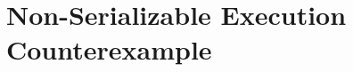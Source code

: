 
\section{Non-Serializable Execution Counterexample}
\label{appendix:non-serializable-execution-example}

%
%
%

%
%
%
%
%


